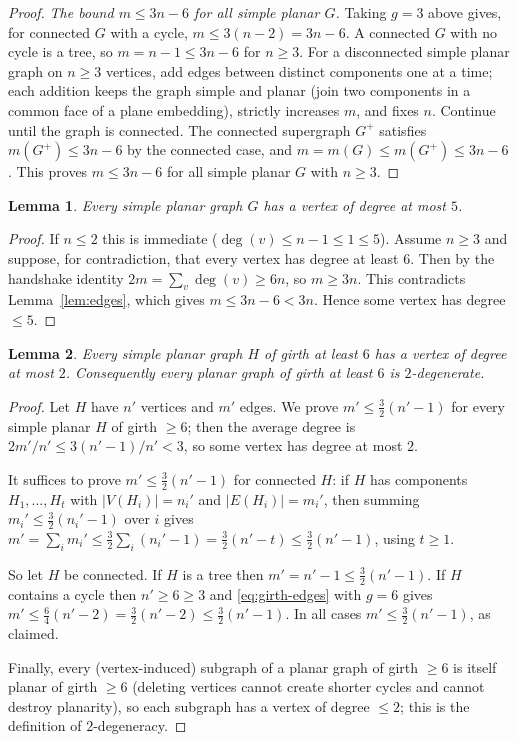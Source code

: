 \documentclass{amsart}
\newtheorem{lemma}{Lemma}
\theoremstyle{remark}
\begin{document}
\begin{proof}
\emph{The bound $m\le3n-6$ for all simple planar $G$.} Taking $g=3$ above gives,
for connected $G$ with a cycle, $m\le 3(n-2)=3n-6$. A connected $G$ with no cycle
is a tree, so $m=n-1\le 3n-6$ for $n\ge3$. For a disconnected simple planar graph
on $n\ge3$ vertices, add edges between distinct components one at a time; each
addition keeps the graph simple and planar (join two components in a common face
of a plane embedding), strictly increases $m$, and fixes $n$. Continue until the
graph is connected. The connected supergraph $G^+$ satisfies
$m(G^+)\le 3n-6$ by the connected case, and $m=m(G)\le m(G^+)\le 3n-6$. This
proves $m\le3n-6$ for all simple planar $G$ with $n\ge3$.
\end{proof}

\begin{lemma}\label{lem:mindeg}
Every simple planar graph $G$ has a vertex of degree at most $5$.
\end{lemma}

\begin{proof}
If $n\le2$ this is immediate ($\deg(v)\le n-1\le1\le5$). Assume $n\ge3$ and
suppose, for contradiction, that every vertex has degree at least $6$. Then by the
handshake identity $2m=\sum_{v}\deg(v)\ge 6n$, so $m\ge 3n$. This contradicts
Lemma~\ref{lem:edges}, which gives $m\le 3n-6<3n$. Hence some vertex has degree
$\le5$.
\end{proof}

\begin{lemma}\label{lem:girth6deg}
Every simple planar graph $H$ of girth at least $6$ has a vertex of degree at
most $2$. Consequently every planar graph of girth at least $6$ is
$2$-degenerate.
\end{lemma}

\begin{proof}
Let $H$ have $n'$ vertices and $m'$ edges. We prove $m' \le \tfrac32(n'-1)$ for
every simple planar $H$ of girth $\ge6$; then the average degree is
$2m'/n' \le 3(n'-1)/n' < 3$, so some vertex has degree at most $2$.

It suffices to prove $m'\le\tfrac32(n'-1)$ for connected $H$: if $H$ has
components $H_1,\dots,H_t$ with $|V(H_i)|=n_i'$ and $|E(H_i)|=m_i'$, then summing
$m_i'\le\tfrac32(n_i'-1)$ over $i$ gives
$m'=\sum_i m_i'\le \tfrac32\sum_i(n_i'-1)=\tfrac32(n'-t)\le\tfrac32(n'-1)$, using
$t\ge1$.

So let $H$ be connected. If $H$ is a tree then $m'=n'-1\le\tfrac32(n'-1)$. If $H$
contains a cycle then $n'\ge6\ge3$ and \eqref{eq:girth-edges} with $g=6$ gives
$m'\le \tfrac{6}{4}(n'-2)=\tfrac32(n'-2)\le\tfrac32(n'-1)$. In all cases
$m'\le\tfrac32(n'-1)$, as claimed.

Finally, every (vertex-induced) subgraph of a planar graph of girth $\ge6$ is
itself planar of girth $\ge6$ (deleting vertices cannot create shorter cycles and
cannot destroy planarity), so each subgraph has a vertex of degree $\le2$; this
is the definition of $2$-degeneracy.
\end{proof}
\end{document}

